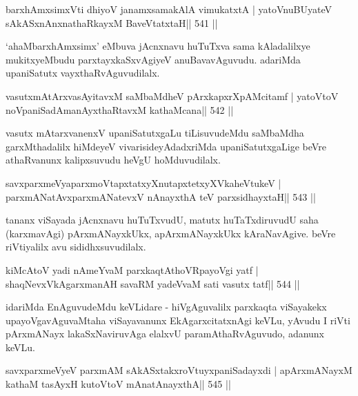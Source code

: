 
\begin{shl}
barxhAmxsimxVti dhiyoV janamxsamakAlA vimukatxtA |
yatoV\s nuBUyateV sAkASxnAnxnathaRkayxM BaveVtatxtaH\hfill || 541 ||
\end{shl}

\begin{artha}
`ahaMbarxhAmxsimx' eMbuva jAcnxnavu huTuTxva sama kAladalilxye mukitxyeMbudu parxtayxkaSxvAgiyeV anuBavavAguvudu. adariMda upaniSatutx vayxthaRvAguvudilalx.
\end{artha}

\begin{shl}
vasutxmAtArxvasAyitavxM saMbaMdheV pArxkapxrXpAMcitamf |
yatoV\s toV noVpaniSadAmanAyxthaRtavxM kathaMcana\hfill || 542 ||
\end{shl}

\begin{artha}
vasutx mAtarxvanenxV upaniSatutxgaLu tiLisuvudeMdu saMbaMdha garxMthadalilx hiMdeyeV vivarisideyAdadxriMda upaniSatutxgaLige beVre athaRvanunx kalipxsuvudu heVgU hoMduvudilalx.
\end{artha}



\begin{shl}
savxparxmeVyaparxmoVtapxtatxyXnutapxtetxyXVkaheVtukeV |
parxmANatAvxparxmANatevxV nAnayxthA teV parxsidhayxtaH\hfill || 543 ||
\end{shl}

\begin{artha}
tananx viSayada jAcnxnavu huTuTxvudU, matutx huTaTxdiruvudU saha (karxmavAgi) pArxmANayxkUkx, apArxmANayxkUkx kAraNavAgive. beVre riVtiyalilx avu sididhxsuvudilalx.
\end{artha}

\begin{shl}
kiMcAtoV yadi nAmeYvaM parxkaqtAthoVRpayoVgi yatf |
shaqNevxVkAgarxmanAH savaRM yadeVvaM sati vasutx tatf\hfill || 544 ||
\end{shl}

\begin{artha}
idariMda EnAguvudeMdu keVLidare - hiVgAguvalilx parxkaqta viSayakekx upayoVgavAguvaMtaha viSayavanunx EkAgarxcitatxnAgi keVLu, yAvudu I riVti pArxmANayx lakaSxNaviruvAga elalxvU paramAthaRvAguvudo, adanunx keVLu.
\end{artha}

\begin{shl}
savxparxmeVyeV parxmAM sAkASxtakxroVtuyxpaniSadayxdi |
apArxmANayxM kathaM tasAyxH kutoV\s toV mAnatA\s nayxthA\hfill || 545 ||
\end{shl}

